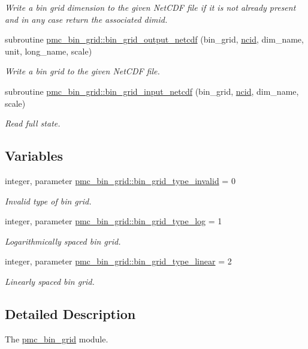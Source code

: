 \begin{DoxyCompactItemize}
\begin{DoxyCompactList}\small\item\em Write a bin grid dimension to the given Net\+C\+DF file if it is not already present and in any case return the associated dimid. \end{DoxyCompactList}\item 
subroutine \mbox{\hyperlink{namespacepmc__bin__grid_a00d8227bfb4b1e12eca6f5317dd4fd78}{pmc\+\_\+bin\+\_\+grid\+::bin\+\_\+grid\+\_\+output\+\_\+netcdf}} (bin\+\_\+grid, \mbox{\hyperlink{fractal_8_f90_a4e89f3f850921ff84a6dfce8b166ad50}{ncid}}, dim\+\_\+name, unit, long\+\_\+name, scale)
\begin{DoxyCompactList}\small\item\em Write a bin grid to the given Net\+C\+DF file. \end{DoxyCompactList}\item 
subroutine \mbox{\hyperlink{namespacepmc__bin__grid_a962c49d1900bde86c51da0e40d7b6110}{pmc\+\_\+bin\+\_\+grid\+::bin\+\_\+grid\+\_\+input\+\_\+netcdf}} (bin\+\_\+grid, \mbox{\hyperlink{fractal_8_f90_a4e89f3f850921ff84a6dfce8b166ad50}{ncid}}, dim\+\_\+name, scale)
\begin{DoxyCompactList}\small\item\em Read full state. \end{DoxyCompactList}\end{DoxyCompactItemize}
\subsection*{Variables}
\begin{DoxyCompactItemize}
\item 
integer, parameter \mbox{\hyperlink{namespacepmc__bin__grid_a1cbd1db8f8656cd463a3316504fb8ff1}{pmc\+\_\+bin\+\_\+grid\+::bin\+\_\+grid\+\_\+type\+\_\+invalid}} = 0
\begin{DoxyCompactList}\small\item\em Invalid type of bin grid. \end{DoxyCompactList}\item 
integer, parameter \mbox{\hyperlink{namespacepmc__bin__grid_a2132d94b8aad57a55efc8f8356690148}{pmc\+\_\+bin\+\_\+grid\+::bin\+\_\+grid\+\_\+type\+\_\+log}} = 1
\begin{DoxyCompactList}\small\item\em Logarithmically spaced bin grid. \end{DoxyCompactList}\item 
integer, parameter \mbox{\hyperlink{namespacepmc__bin__grid_ae02a160719a835f7ee0c048539c257cd}{pmc\+\_\+bin\+\_\+grid\+::bin\+\_\+grid\+\_\+type\+\_\+linear}} = 2
\begin{DoxyCompactList}\small\item\em Linearly spaced bin grid. \end{DoxyCompactList}\end{DoxyCompactItemize}


\subsection{Detailed Description}
The \mbox{\hyperlink{namespacepmc__bin__grid}{pmc\+\_\+bin\+\_\+grid}} module. 

